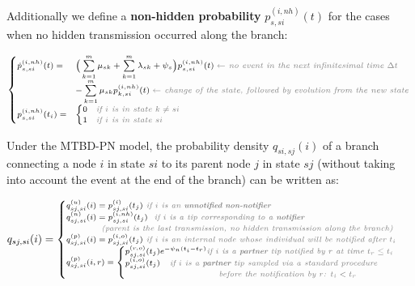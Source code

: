 \documentclass[a4paper,10pt]{article}
\begin{document}
Additionally we define a \textbf{non-hidden probability} $p^{(i,nh)}_{s,si}(t)$ for the cases when no hidden transmission occurred along the branch:

\begin{equation}
\scriptsize
\begin{cases}
\dot{p}_{s,si}^{(i,nh)}(t) = & \Big(\sum\limits_{k=1}^{m} \mu_{sk} + \sum\limits_{k=1}^{m} \lambda_{sk} + \psi_s\Big) p_{s,si}^{(i,nh)}(t)\; \textit{\color{gray} $\leftarrow$ no event in the next infinitesimal time $\Delta t$ }\\
    & - \sum\limits_{k=1}^{m} \mu_{sk} p_{k,si}^{(i,nh)}(t)\;  \textit{\color{gray} $\leftarrow$ change of the state, followed by evolution from the new state }\\
p_{s,si}^{(i,nh)}(t_i) = & 
    \begin{cases}
    0 & \textit{\color{gray} if $i$ is in state $k \neq si$}\\
    1 & \textit{\color{gray} if $i$ is in state $si$}
    \end{cases}\label{eq:p-nh}
\end{cases}
\end{equation}

Under the MTBD-PN model, the probability density $q_{si,sj}(i)$ of a branch connecting a node $i$ in state $si$ to its parent node $j$ in state $sj$ (without taking into account the event at the end of the branch) can be written as:


\begin{equation}
\scriptsize
q_{sj,si}(i) = 
\begin{cases}
q^{(u)}_{sj,si}(i) = p^{(i)}_{sj,si}(t_j) \textit{\color{gray} ~if $i$ is an \textbf{unnotified non-notifier}}\\
q_{sj,si}^{(n)}(i) = 
p_{sj,si}^{(i,nh)}(t_j) \textit{\color{gray} ~~if $i$ is a tip corresponding to a \textbf{notifier}}\\
~~~~~~~~~~~~ \textit{\color{gray}(parent is the last transmission, no hidden transmission along the branch)}
\\
q^{(p)}_{sj,si}(i)  = p^{(i, o)}_{sj,si}(t_j)  \textit{\color{gray} ~if $i$ is an internal node whose individual will be notified after $t_i$}
\\
q^{(p)}_{sj,si}(i, r)  = 
\begin{cases}
p^{(r, o)}_{sj,si}(t_j) e^{- \psi_n (t_i - t_r)} \textit{\color{gray} if $i$ is a \textbf{partner} tip notified by $r$ at time $t_r \leq t_i$}\\
p^{(i, o)}_{sj,si}(t_j) \textit{\color{gray}~~ if $i$ is a \textbf{partner} tip sampled via a standard procedure} \\
~~~~~~~~~~~~~~~~~~~~~~~~~~~~~~~~\textit{\color{gray} before the notification by $r$: $t_i < t_r$}\\
\end{cases}
\end{cases}
\label{eq:branch}
\end{equation}
\end{document}
